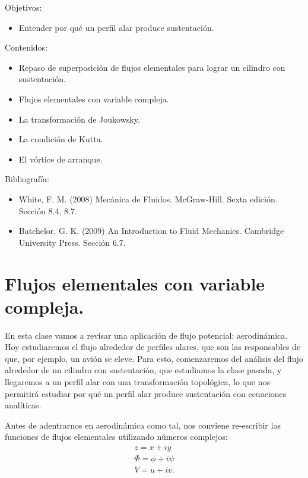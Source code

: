 \begin{framed}

Objetivos:
\begin{itemize}
    \item Entender por qué un perfil alar produce sustentación. 
\end{itemize}

Contenidos:
\begin{itemize}
    \item Repaso de superposición de flujos elementales para lograr un cilindro con sustentación.
    \item Flujos elementales con variable compleja. 
    \item La transformación de Joukowsky.
    \item La condición de Kutta.
    \item El vórtice de arranque.
\end{itemize}

Bibliografía:
\begin{itemize}
    \item White, F. M. (2008) Mecánica de Fluidos. McGraw-Hill. Sexta edición. Sección 8.4, 8.7.
    \item Batchelor, G. K. (2009) An Introduction to Fluid Mechanics. Cambridge University Press. Sección 6.7.
\end{itemize}
\end{framed}

\section*{Flujos elementales con variable compleja.}

En esta clase vamos a revisar una aplicación de flujo potencial: aerodinámica.
Hoy estudiaremos el flujo alrededor de perfiles alares, que son las responsables de que, por ejemplo, un avión se eleve.
Para esto, comenzaremos del análisis del flujo alrededor de un cilindro con sustentación, que estudiamos la clase pasada, y llegaremos a un perfil alar con una transformación topológica, lo que nos permitirá estudiar por qué un perfil alar produce sustentación con ecuaciones analíticas.

Antes de adentrarnos en aerodinámica como tal, nos conviene re-escribir las funciones de flujos elementales utilizando números complejos:
%
\begin{align}\label{eq:z_complejo}
z = x+iy\nonumber\\
\Phi = \phi + i\psi\nonumber\\
V = u+iv.
\end{align}

